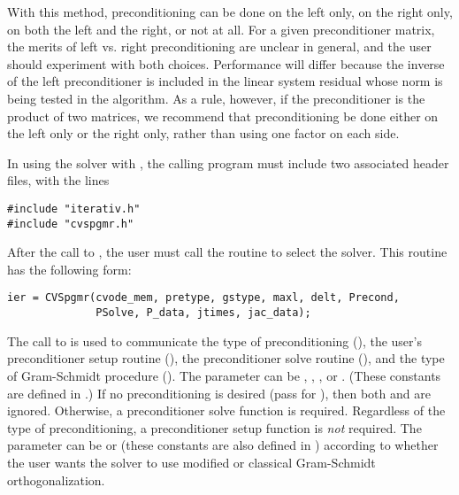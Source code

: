 \begin{itemize}
  With this {\spgmr} method, preconditioning can be done on the left only,
  on the right only, on both the left and the right, or not at all.  For
  a given preconditioner matrix, the merits of left vs. right
  preconditioning are unclear in general, and the user should experiment
  with both choices.  Performance will differ because the inverse of the
  left preconditioner is included in the linear system residual whose
  norm is being tested in the {\spgmr} algorithm.  As a rule, however, if
  the preconditioner is the product of two matrices, we recommend that
  preconditioning be done either on the left only or the right only,
  rather than using one factor on each side.
  
  In using the {\cvspgmr} solver with {\cvode}, the calling program must
  include two associated header files, with the lines
\begin{verbatim}
#include "iterativ.h"
#include "cvspgmr.h"
\end{verbatim}
  \par After the call to , the user must call the routine 
  to select the {\cvdiag} solver. This routine has the following form:
\begin{verbatim}
ier = CVSpgmr(cvode_mem, pretype, gstype, maxl, delt, Precond, 
              PSolve, P_data, jtimes, jac_data);
\end{verbatim}
  
  The call to  is used to communicate the type of
  preconditioning (), the user's preconditioner setup
  routine (), the preconditioner solve routine (),
  and the type of Gram-Schmidt procedure (). The 
  parameter can be , , , or .
  (These constants are defined in .)  If no preconditioning
  is desired (pass  for ), then both  and
   are ignored.  Otherwise, a preconditioner solve function
   is required.  Regardless of the type of preconditioning,
  a preconditioner setup function  is {\em not} required. 
  The  parameter can be  or 
  (these constants are also defined in ) according to
  whether the user wants the {\cvspgmr} solver to use modified or classical
  Gram-Schmidt orthogonalization.
  

\end{itemize}
